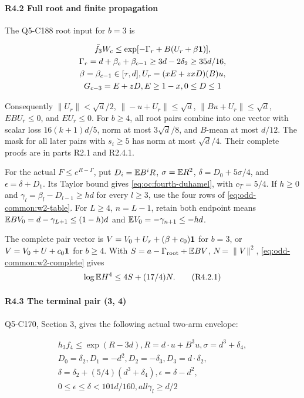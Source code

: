 \paragraph{R4.2 Full root and finite propagation}

The Q5-C188 root input for \(b=3\) is

\[
\begin{gathered}
\bar f_3W_c\le \exp[-\Gamma_r+B(U_r+\beta\mathbf1)],\\
\Gamma_r=d+\beta_c+\beta_{c-1}\ge 3d-2\delta_2\ge 35d/16,\\
\beta=\beta_{c-1}\in[\tau,d],U_r=(xE+zxD)(B)u,\\
G_{c-3}=E+zD,E\ge 1-x,0\le D\le 1
\end{gathered}
\]

Consequently \(\|U_r\|<\sqrt d/2\), \(\|-u+U_r\|\le\sqrt d\), \(\|Bu+U_r\|\le\sqrt d\), \(EBU_r\le0\), and \(EU_r\le0\). For \(b\ge4\), all root pairs combine into one vector with scalar loss \(16(k+1)d/5\), norm at most \(3\sqrt d/8\), and \(B\)-mean at most \(d/12\). The mask for all later pairs with \(s_i\ge5\) has norm at most \(\sqrt d/4\). Their complete proofs are in parts R2.1 and R2.4.1.

For the actual \(F\le e^{R-\Gamma}\), put
\(D_i=\mathbb E B^iR\), \(\sigma=\mathbb E R^2\),
\(\delta=D_0+5\sigma/4\), and \(\epsilon=\delta+D_1\).
Its Taylor bound gives \eqref{eq:oc:fourth-duhamel}, with \(c_T=5/4\).
If \(h\ge0\) and \(\gamma_l=\beta_l-D_{l-1}\ge hd\) for every \(l\ge3\),
use the four rows of \eqref{eq:odd-common:w2-table}.
For \(L\ge4\), \(n=L-1\), retain both endpoint means
\(\mathbb E BV_0=d-\gamma_{L+1}\le(1-h)d\) and
\(\mathbb E V_0=-\gamma_{n+1}\le-hd\).

The complete pair vector is
\(V=V_0+U_r+(\beta+c_0)\mathbf1\) for \(b=3\), or
\(V=V_0+U+c_0\mathbf1\) for \(b\ge4\).
With \(S=a-\Gamma_{\rm root}+\mathbb E BV\), \(N=\|V\|^2\),
\eqref{eq:odd-common:w2-complete} gives
\[
 \log\mathbb E H^4\le4S+(17/4)N.\tag{R4.2.1}
\]

\paragraph{R4.3 The terminal pair (3, 4)}

Q5-C170, Section 3, gives the following actual two-arm envelope:

\[
\begin{gathered}
h_3f_4\le \exp(R-3d),R=d\cdot u+B^3u,\sigma=d^3+\delta_4,\\
D_0=\delta_2,D_1=-d^2,D_2=-\delta_3,D_3=d\cdot \delta_2,\\
\delta=\delta_2+(5/4)(d^3+\delta_4),\epsilon=\delta-d^2,\\
0\le \epsilon\le \delta<101d/160,all \gamma_l\ge d/2
\end{gathered}
\]

